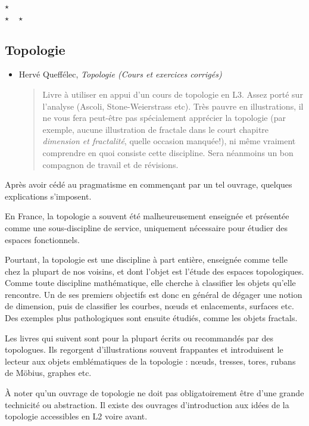 \documentclass{article}
\def\separateur{\begin{center}
$\star$\\
$\star\quad\star$
\end{center}}
\begin{document}
\separateur
\subsection{Topologie}


\begin{mdframed}
\begin{itemize}
\item Hervé Queffélec, \emph{Topologie (Cours et exercices corrigés)}
\begin{quote}
Livre à utiliser en appui d'un cours de topologie en L3. 	Assez porté sur l'analyse (Ascoli, Stone-Weierstrass etc). Très pauvre en illustrations, il ne vous fera peut-être pas spécialement apprécier la topologie (par exemple, aucune illustration de fractale dans le court chapitre \emph{dimension et fractalité}, quelle occasion manquée!), ni même vraiment comprendre en quoi consiste cette discipline. Sera néanmoins un  bon compagnon de travail et de révisions.
\end{quote}
\end{itemize} 
\end{mdframed}

Après avoir cédé au pragmatisme en commençant par un tel ouvrage, quelques explications s'imposent.

En France, la topologie a souvent été malheureusement enseignée et présentée comme une sous-discipline de service, uniquement nécessaire pour étudier des espaces fonctionnels.

Pourtant, la topologie est une discipline à part entière, enseignée comme telle chez la plupart de nos voisins, et dont l'objet est l'étude des espaces topologiques. 
Comme toute discipline mathématique, elle cherche à classifier les objets qu'elle rencontre. Un de ses premiers objectifs est donc en général de dégager une notion de dimension, puis de classifier les courbes, n\oe uds et enlacements, surfaces etc. Des exemples plus pathologiques sont ensuite étudiés, comme les objets fractals.

Les livres qui suivent sont pour la plupart écrits ou recommandés par des topologues. Ils regorgent d'illustrations souvent frappantes et introduisent le lecteur aux objets emblématiques de la topologie : n\oe uds, tresses, tores, rubans de Möbius, graphes etc.

À noter qu'un ouvrage de topologie ne doit pas obligatoirement être d'une grande technicité ou abstraction. Il existe des ouvrages d'introduction aux idées de la topologie accessibles en L2 voire avant.
\end{document}
